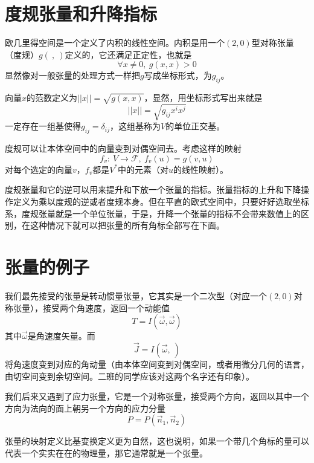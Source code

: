 \documentclass[a4paper,11pt]{ctexart}
\newcommand{\beq}{\begin{equation}}
\newcommand{\eeq}{\end{equation}}
\newcommand{\field}{\mathscr{F}}
\begin{document}
\section{度规张量和升降指标}
欧几里得空间是一个定义了内积的线性空间。内积是用一个$(2,0)$型对称张量（度规）$g(\ ,\ )$定义的，它还满足正定性，也就是
\beq
\forall x \not= 0,\ g(x,x)>0
\eeq
显然像对一般张量的处理方式一样把$g$写成坐标形式，为$g_{ij}$。
\par
向量$x$的范数定义为$||x|| = \sqrt{g(x,x)}$，显然，用坐标形式写出来就是
\beq
||x|| = \sqrt{g_{ij} x^i x^j}
\eeq
一定存在一组基使得$g_{ij} = \delta_{ij}$，这组基称为$V$的单位正交基。
\par
度规可以让本体空间中的向量变到对偶空间去。考虑这样的映射
\beq
f_v:\ V \to \field,\ f_v (u) = g(v,u)
\eeq
对每个选定的向量$v$，$f_v$都是$V^*$中的元素（对$u$的线性映射）。
\par
度规张量和它的逆可以用来提升和下放一个张量的指标。张量指标的上升和下降操作定义为乘以度规的逆或者度规本身。但在平直的欧式空间中，只要好好选取坐标系，度规张量就是一个单位张量，于是，升降一个张量的指标不会带来数值上的区别，在这种情况下就可以把张量的所有角标全部写在下面。

\section{张量的例子}
我们最先接受的张量是转动惯量张量，它其实是一个二次型（对应一个$(2,0)$对称张量），接受两个角速度，返回一个动能值
\beq
T = I(\vec{\omega},\vec{\omega})
\eeq
其中$\vec{\omega}$是角速度矢量。而
\beq
\vec{J} = I(\vec{\omega},\ )
\eeq
将角速度变到对应的角动量（由本体空间变到对偶空间，或者用微分几何的语言，由切空间变到余切空间。二班的同学应该对这两个名字还有印象）。
\par
我们后来又遇到了应力张量，它是一个对称张量，接受两个方向，返回以其中一个方向为法向的面上朝另一个方向的应力分量
\beq
P = P(\vec{n}_1,\vec{n}_2)
\eeq
\par
张量的映射定义比基变换定义更为自然，这也说明，如果一个带几个角标的量可以代表一个实实在在的物理量，那它通常就是一个张量。
\end{document}
